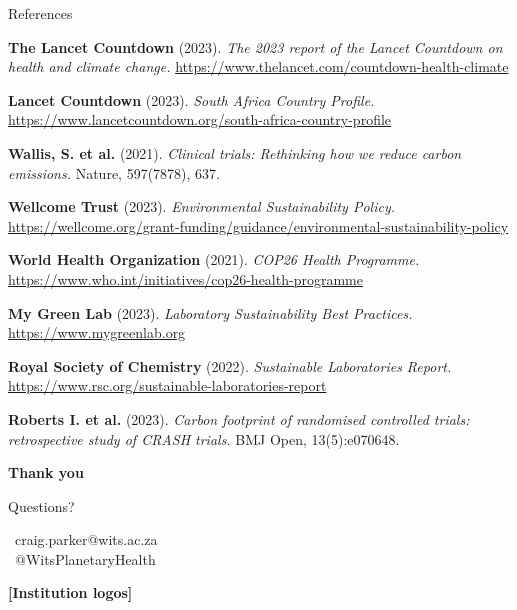\documentclass{beamer}
\begin{document}
\begin{frame}[allowframebreaks]{References}
\begin{thebibliography}{99}
\textbf{The Lancet Countdown} (2023).
\textit{The 2023 report of the Lancet Countdown on health and climate change.}
\url{https://www.thelancet.com/countdown-health-climate}

\textbf{Lancet Countdown} (2023).
\textit{South Africa Country Profile.}
\url{https://www.lancetcountdown.org/south-africa-country-profile}

\textbf{Wallis, S. et al.} (2021).
\textit{Clinical trials: Rethinking how we reduce carbon emissions.}
Nature, 597(7878), 637.

\textbf{Wellcome Trust} (2023).
\textit{Environmental Sustainability Policy.}
\url{https://wellcome.org/grant-funding/guidance/environmental-sustainability-policy}

\textbf{World Health Organization} (2021).
\textit{COP26 Health Programme.}
\url{https://www.who.int/initiatives/cop26-health-programme}

\textbf{My Green Lab} (2023).
\textit{Laboratory Sustainability Best Practices.}
\url{https://www.mygreenlab.org}

\textbf{Royal Society of Chemistry} (2022).
\textit{Sustainable Laboratories Report.}
\url{https://www.rsc.org/sustainable-laboratories-report}

\textbf{Roberts I. et al.} (2023).
\textit{Carbon footprint of randomised controlled trials: retrospective study of CRASH trials.}
BMJ Open, 13(5):e070648.
\end{thebibliography}
\end{frame}

\begin{frame}[plain]
\begin{center}
\vspace{1cm}
{\Large\textbf{Thank you}}

\vspace{0.5cm}
{\large Questions?}

\vspace{1cm}
\faEnvelope\ craig.parker@wits.ac.za\\
\faTwitter\ @WitsPlanetaryHealth
\end{center}

\begin{center}
\vspace{1cm}
\textbf{[Institution logos]}
\end{center}
\end{frame}
\end{document}
